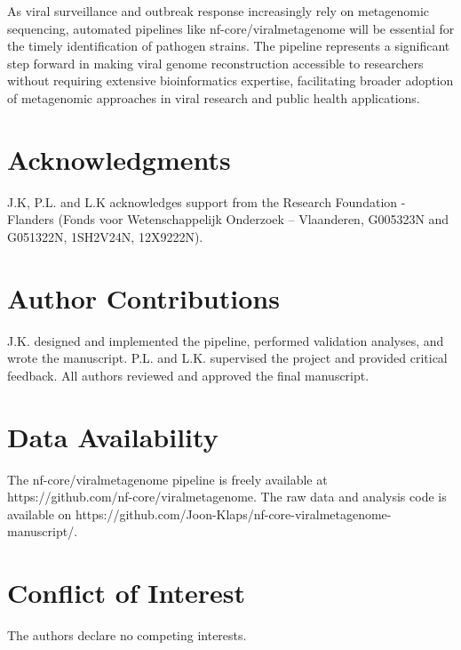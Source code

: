 As viral surveillance and outbreak response increasingly rely on metagenomic sequencing, automated pipelines like nf-core/viralmetagenome will be essential for the timely identification of pathogen strains. The pipeline represents a significant step forward in making viral genome reconstruction accessible to researchers without requiring extensive bioinformatics expertise, facilitating broader adoption of metagenomic approaches in viral research and public health applications.


\section*{Acknowledgments}
 J.K, P.L. and L.K  acknowledges support from the Research Foundation - Flanders (Fonds voor Wetenschappelijk Onderzoek – Vlaanderen, G005323N and G051322N, 1SH2V24N, 12X9222N).

\section*{Author Contributions}
J.K. designed and implemented the pipeline, performed validation analyses, and wrote the manuscript. P.L. and L.K. supervised the project and provided critical feedback. All authors reviewed and approved the final manuscript.

\section*{Data Availability}
The nf-core/viralmetagenome pipeline is freely available at https://github.com/nf-core/viralmetagenome.
The raw data and analysis code is available on https://github.com/Joon-Klaps/nf-core-viralmetagenome-manuscript/.

\section*{Conflict of Interest}
The authors declare no competing interests.

